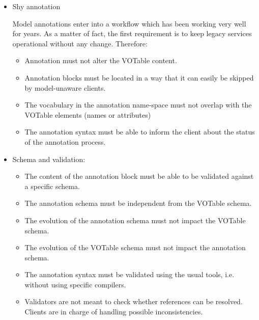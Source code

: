 \begin {itemize}
  \item Shy annotation 
  
  	Model annotations enter into a workflow which has been working very well for years. As a matter of fact, the first requirement is to keep 
	legacy services operational without any change. Therefore: 
	
  \begin {itemize}
    \item Annotation must not alter the VOTable content.
    \item Annotation blocks must be located in a way that it can easily be skipped by model-unaware clients.
    \item The vocabulary in the annotation name-space must not overlap with the VOTable elements (names or attributes)    
    \item The annotation syntax must be able to inform the client about the status of the annotation process.
  \end {itemize}
  
  \item Schema and validation:
  \begin {itemize}
     \item The content of the annotation block must be able to be validated against a specific schema.
    \item The annotation schema must be independent from the VOTable schema.
    \item The evolution of the annotation schema must not impact the VOTable schema.
    \item The evolution of the VOTable schema must not impact the annotation schema.
    \item The annotation syntax must be validated using the usual tools, i.e. without using specific compilers.
    \item Validators are not meant to check whether references can be resolved. Clients are in charge of handling possible inconsistencies.
  \end {itemize}
  

\end{itemize}
